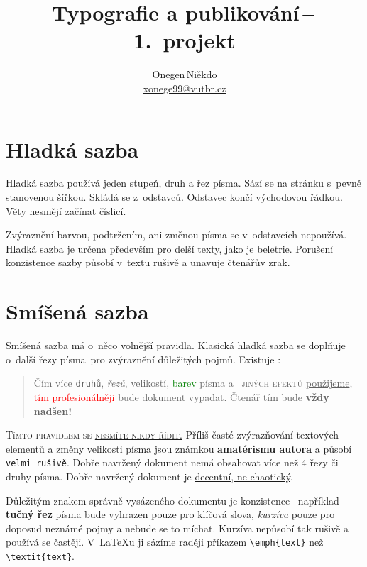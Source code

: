\documentclass[a4paper, twocolumn, 10pt]{article}
\title{Typografie a publikování\,--\,1.\ projekt}
\author{Onegen\,Niěkdo \\
    \href{mailto:xonege99@vutbr.cz}{xonege99@vutbr.cz}}
\date{}
\begin{document}
\maketitle

\section{Hladká sazba}

Hladká sazba používá jeden stupeň, druh a řez písma.
Sází se na stránku s~pevně stanovenou šířkou.
Skládá se z~odstavců. Odstavec končí východovou řádkou.
Věty nesmějí začínat číslicí. \par
Zvýraznění barvou, podtržením, ani změnou písma se v~odstavcích nepoužívá.
Hladká sazba je určena především pro delší texty, jako je beletrie.
Porušení konzistence sazby působí v~textu rušivě a unavuje čtenářův zrak.

\section{Smíšená sazba}

Smíšená sazba má o~něco volnější pravidla. Klasická hladká
sazba se doplňuje o~další řezy písma~pro zvýraznění důležitých pojmů.
Existuje :

\begin{quotation}

	Čím více \texttt{druhů}, \textit{řezů}, {\tiny velikostí}, \textcolor{green}{barev} písma
	a~{\scshape\color{blue} jiných efektů} \underline{použijeme}, \textcolor{red}{tím profesionál\-něji}
	bude {\selectfont dokument} vypadat. Čtenář tím bude
		{\Huge \textbf{vždy nadšen!}}

\end{quotation}

{\scshape Tímto pravidlem se \underline{nesmíte nikdy řídit.}}
Příliš časté zvýrazňování textových elementů a změny {\scriptsize velikosti} písma
jsou známkou \textbf{amatérismu autora} a působí \texttt{velmi rušivě}.
Dobře navržený dokument nemá obsahovat více než 4 řezy či druhy písma.
Dobře navržený dokument je \underline{decentní, ne chaotický}.

Důležitým znakem správně vysázeného dokumentu je konzistence\,--\,například
\textbf{tučný řez} písma bude vyhrazen pouze pro klíčová slova,
\emph{kurzíva} pouze pro doposud neznámé pojmy a nebude se to míchat.
Kurzíva nepůsobí tak rušivě a používá se častěji.
V~\LaTeX{}u ji sázíme raději příkazem {\ttfamily \verb|\emph{text}|} než {\ttfamily \verb|\textit{text}|}.
\end{document}
